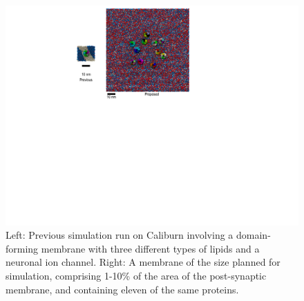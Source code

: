 \documentclass[oneside]{report}
\begin{document}
\begin{figure}[h]
\begin{center}
\includegraphics [scale=.4]{Science_Fig2.pdf}
\end{center}
\label{fig:Sci}
\caption{ Left: Previous simulation\cite{Sharp2019} run on Caliburn involving a domain-forming membrane with three different types of lipids and a neuronal ion channel. Right: A membrane of the size planned for simulation, comprising 1-10\% of the area of the post-synaptic membrane, and containing eleven of the same proteins.}
\end{figure}


\end{document}
